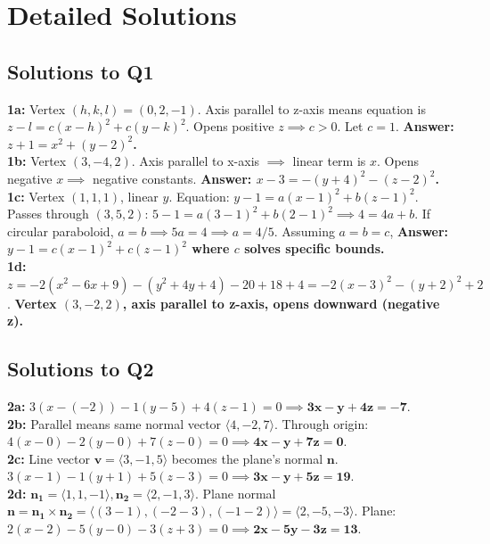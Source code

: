 \documentclass[11pt]{article}
\begin{document}
\section{Detailed Solutions}

\subsection{Solutions to Q1}
\textbf{1a:} Vertex $(h,k,l) = (0,2,-1)$. Axis parallel to z-axis means equation is $z - l = c(x-h)^2 + c(y-k)^2$. Opens positive $z \implies c > 0$. Let $c=1$. \textbf{Answer: $z + 1 = x^2 + (y-2)^2$.}\\
\textbf{1b:} Vertex $(3, -4, 2)$. Axis parallel to x-axis $\implies$ linear term is $x$. Opens negative $x \implies$ negative constants. \textbf{Answer: $x - 3 = -(y+4)^2 - (z-2)^2$.}\\
\textbf{1c:} Vertex $(1,1,1)$, linear $y$. Equation: $y-1 = a(x-1)^2 + b(z-1)^2$. Passes through $(3,5,2)$: $5-1 = a(3-1)^2 + b(2-1)^2 \implies 4 = 4a + b$. If circular paraboloid, $a=b \implies 5a=4 \implies a=4/5$. Assuming $a=b=c$, \textbf{Answer: $y - 1 = c(x-1)^2 + c(z-1)^2$ where $c$ solves specific bounds.}\\
\textbf{1d:} $z = -2(x^2 - 6x + 9) - (y^2 + 4y + 4) - 20 + 18 + 4 = -2(x-3)^2 - (y+2)^2 + 2$. \textbf{Vertex $(3, -2, 2)$, axis parallel to z-axis, opens downward (negative z).}

\subsection{Solutions to Q2}
\textbf{2a:} $3(x - (-2)) - 1(y - 5) + 4(z - 1) = 0 \implies \mathbf{3x - y + 4z = -7}$.\\
\textbf{2b:} Parallel means same normal vector $\langle 4, -2, 7 \rangle$. Through origin: $4(x-0) - 2(y-0) + 7(z-0) = 0 \implies \mathbf{4x - y + 7z = 0}$.\\
\textbf{2c:} Line vector $\mathbf{v} = \langle 3, -1, 5 \rangle$ becomes the plane's normal $\mathbf{n}$. $3(x-1) - 1(y+1) + 5(z-3) = 0 \implies \mathbf{3x - y + 5z = 19}$.\\
\textbf{2d:} $\mathbf{n_1} = \langle 1, 1, -1 \rangle, \mathbf{n_2} = \langle 2, -1, 3 \rangle$. Plane normal $\mathbf{n} = \mathbf{n_1} \times \mathbf{n_2} = \langle (3-1), (-2-3), (-1-2) \rangle = \langle 2, -5, -3 \rangle$. Plane: $2(x-2) - 5(y-0) - 3(z+3) = 0 \implies \mathbf{2x - 5y - 3z = 13}$.
\end{document}
